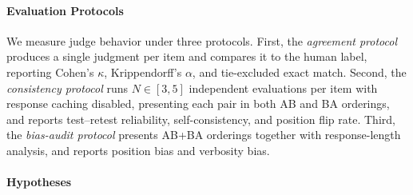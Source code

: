 \documentclass[11pt]{article}
\begin{document}
\paragraph{Evaluation Protocols}


We measure judge behavior under three protocols. First, the \textit{agreement protocol} produces a single judgment per item and compares it to the human label, reporting Cohen's $\kappa$, Krippendorff's $\alpha$, and tie-excluded exact match. Second, the \textit{consistency protocol} runs $N \in [3, 5]$ independent evaluations per item with response caching disabled, presenting each pair in both AB and BA orderings, and reports test--retest reliability, self-consistency, and position flip rate. Third, the \textit{bias-audit protocol} presents AB+BA orderings together with response-length analysis, and reports position bias and verbosity bias. 

\paragraph{Hypotheses}

\end{document}

